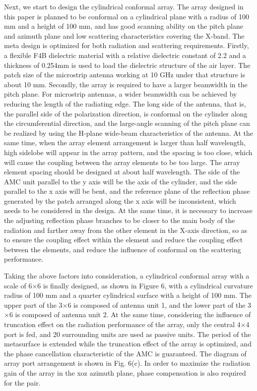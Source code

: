 \documentclass[USenglish]{article}
\theoremstyle{dgthm}
\theoremstyle{dgdef}
\begin{document}
Next, we start to design the cylindrical conformal array. The array designed in this paper is planned to be conformal on a cylindrical plane with a radius of 100 mm and a height of 100 mm, and has good scanning ability on the pitch plane and azimuth plane and low scattering characteristics covering the X-band. The meta design is optimized for both radiation and scattering requirements. Firstly, a flexible F4B dielectric material with a relative dielectric constant of 2.2 and a thickness of 0.254mm is used to load the dielectric structure of the air layer. The patch size of the microstrip antenna working at 10 GHz under that structure is about 10 mm. Secondly, the array is required to have a larger beamwidth in the pitch plane. For microstrip antennas, a wider beamwidth can be achieved by reducing the length of the radiating edge. The long side of the antenna, that is, the parallel side of the polarization direction, is conformal on the cylinder along the circumferential direction, and the large-angle scanning of the pitch plane can be realized by using the H-plane wide-beam characteristics of the antenna. At the same time, when the array element arrangement is larger than half wavelength, high sidelobe will appear in the array pattern, and the spacing is too close, which will cause the coupling between the array elements to be too large. The array element spacing should be designed at about half wavelength. The side of the AMC unit parallel to the y axis will be the axis of the cylinder, and the side parallel to the x axis will be bent, and the reference plane of the reflection phase generated by the patch arranged along the x axis will be inconsistent, which needs to be considered in the design. At the same time, it is necessary to increase the adjusting reflection phase branches to be closer to the main body of the radiation and farther away from the other element in the X-axis direction, so as to ensure the coupling effect within the element and reduce the coupling effect between the elements, and reduce the influence of conformal on the scattering performance.


Taking the above factors into consideration, a cylindrical conformal array with a scale of 6$\times$6 is finally designed, as shown in Figure 6, with a cylindrical curvature radius of 100 mm and a quarter cylindrical surface with a height of 100 mm. The upper part of the 3$\times$6 is composed of antenna unit 1, and the lower part of the 3$\times$6 is composed of antenna unit 2. At the same time, considering the influence of truncation effect on the radiation performance of the array, only the central 4$\times$4 port is fed, and 20 surrounding units are used as passive units. The period of the metasurface is extended while the truncation effect of the array is optimized, and the phase cancellation characteristic of the AMC is guaranteed. The diagram of array port arrangement is shown in Fig. 6(c). In order to maximize the radiation gain of the array in the xoz azimuth plane, phase compensation is also required for the pair.
\end{document}
